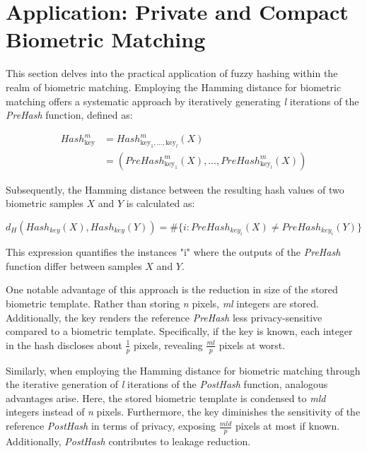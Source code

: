 \newpage
\section{Application: Private and Compact Biometric Matching}
\label{Application: Private and Compact Biometric Matching}

This section delves into the practical application of fuzzy hashing within the realm of biometric matching. Employing the Hamming distance for biometric matching offers a systematic approach by iteratively generating \textit{l} iterations of the \textit{PreHash} function, defined as:

\begin{equation}
    \begin{aligned}
        Hash_{\text{key}}^m &= Hash_{\text{key}_1, \ldots, \text{key}_l}^m(X)\\
        &= (PreHash_{\text{key}_1}^m(X), \ldots, PreHash_{\text{key}_l}^m(X))
    \end{aligned}
\end{equation}

Subsequently, the Hamming distance between the resulting hash values of two biometric samples \(X\) and \(Y\) is calculated as:

\[d_H(Hash_{key}(X), Hash_{key}(Y)) = \# \{i: PreHash_{key_i}(X) \neq PreHash_{key_i}(Y)\}\]

This expression quantifies the instances "i" where the outputs of the \textit{PreHash} function differ between samples \(X\) and \(Y\).

One notable advantage of this approach is the reduction in size of the stored biometric template. Rather than storing \textit{n} pixels, \textit{ml} integers are stored. Additionally, the key renders the reference \textit{PreHash} less privacy-sensitive compared to a biometric template. Specifically, if the key is known, each integer in the hash discloses about \(\frac{1}{p}\) pixels, revealing \(\frac{ml}{p}\) pixels at worst.

Similarly, when employing the Hamming distance for biometric matching through the iterative generation of \textit{l} iterations of the \textit{PostHash} function, analogous advantages arise. Here, the stored biometric template is condensed to \textit{mld} integers instead of \textit{n} pixels. Furthermore, the key diminishes the sensitivity of the reference \textit{PostHash} in terms of privacy, exposing \(\frac{mld}{p}\) pixels at most if known. Additionally, \textit{PostHash} contributes to leakage reduction.

